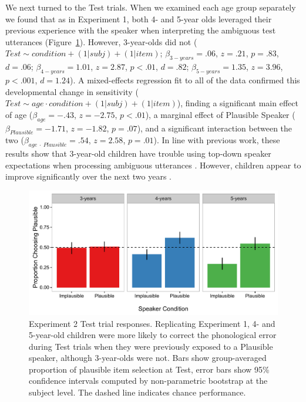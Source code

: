\documentclass[man,floatsintext]{apa6}
\begin{document}
We next turned to the Test trials. When we examined each age group separately we found that as in Experiment 1, both 4- and 5-year olds leveraged their previous experience with the speaker when interpreting the ambiguous test utterances (Figure~\ref{fig:exp2_results}). However, 3-year-olds did not ($Test \sim condition + (1|subj) + (1|item)$; $\beta_{3-years} = .06$, $z = .21$, $p  = .83$, $d = .06$; $\beta_{4-years} = 1.01$, $z = 2.87$, $p < .01$, $d = .82$; $\beta_{5-years} = 1.35$, $z = 3.96$, $p < .001$, $d = 1.24$). A mixed-effects regression fit to all of the data confirmed this developmental change in sensitivity ($Test \sim age \cdot condition + (1|subj) + (1|item)$), finding a significant main effect of age ($\beta_{age} = -.43$, $z = -2.75$, $p < .01$), a marginal effect of Plausible Speaker ($\beta_{Plausible} = -1.71$, $z = -1.82$, $p = .07$), and a significant interaction between the two ($\beta_{age \: \cdot \: Plausible} = .54$, $z = 2.58$, $p = .01$). In line with previous work, these results show that 3-year-old children have trouble using top-down speaker expectations when processing ambiguous utterances \cite{kidd2005}. However, children appear to improve significantly over the next two years \cite{rabagliati2013}.

\begin{figure}[tb]
     \centering
     \includegraphics[width=.95\textwidth]{figures/exp2_results.pdf}
    \caption{Experiment 2 Test trial responses. Replicating Experiment 1, 4- and 5-year-old children were more likely to correct the phonological error during Test trials when they were previously exposed to a Plausible speaker, although 3-year-olds were not. Bars show group-averaged proportion of plausible item selection at Test, error bars show 95\% confidence intervals computed by non-parametric bootstrap at the subject level. The dashed line indicates chance performance.}%
   \label{fig:exp2_results}
\end{figure}
\end{document}
